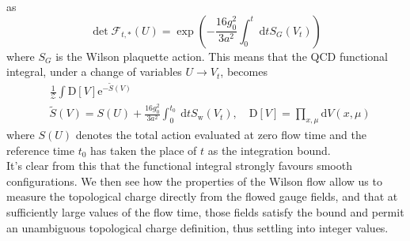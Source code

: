 \documentclass[a4paper,10pt]{book}
\begin{document}
as
\begin{equation}
\operatorname{det} \mathcal{F}_{t, *}(U) = \exp\left( -\frac{16 g_{0}^{2}}{3 a^{2}} \int_{0}^{t} \mathrm{~d} t S_{G}\left(V_{t}\right) \right)
\end{equation}
where $S_{G}$ is the Wilson plaquette action. This means that the QCD functional integral, under a change of variables $U\rightarrow V_t$, becomes
\begin{equation}\label{eq:flowTimeFunctionalIntegral}
\begin{aligned}
&\frac{1}{\mathcal{Z}} \int \mathrm{D}[V] \mathrm{e}^{-\tilde{S}(V)} \\
&\tilde{S}(V)=S(U)+\frac{16 g_{0}^{2}}{3 a^{2}} \int_{0}^{t_{0}} \mathrm{~d} t S_{\mathrm{w}}\left(V_{t}\right), \quad \mathrm{D}[V]=\prod_{x, \mu} \mathrm{d} V(x, \mu)
\end{aligned}
\end{equation}
where $S(U)$ denotes the total action evaluated at zero flow time and the reference time $t_0$ has taken the place of $t$ as the integration bound.\\It's clear from this that the functional integral strongly favours smooth configurations.
We then see how the properties of the Wilson flow allow us to measure the topological charge directly from the flowed gauge fields, and that at sufficiently large values of the flow time, those fields satisfy the bound and permit an unambiguous topological charge definition, thus settling into integer values.
\end{document}
